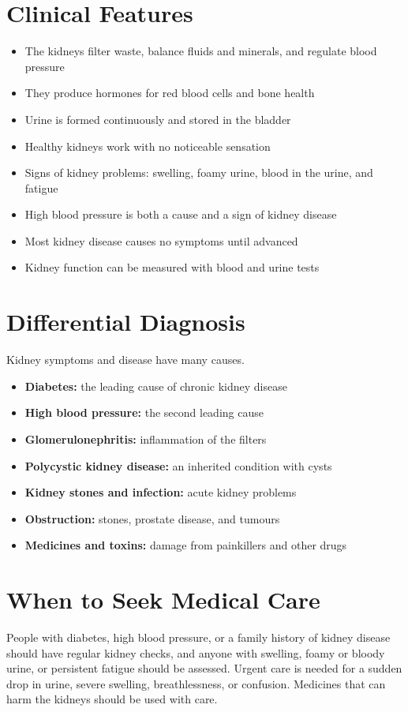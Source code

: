 \section*{Clinical Features}
\begin{itemize}
    \item The kidneys filter waste, balance fluids and minerals, and regulate blood pressure
    \item They produce hormones for red blood cells and bone health
    \item Urine is formed continuously and stored in the bladder
    \item Healthy kidneys work with no noticeable sensation
    \item Signs of kidney problems: swelling, foamy urine, blood in the urine, and fatigue
    \item High blood pressure is both a cause and a sign of kidney disease
    \item Most kidney disease causes no symptoms until advanced
    \item Kidney function can be measured with blood and urine tests
\end{itemize}

\section*{Differential Diagnosis}
Kidney symptoms and disease have many causes.
\begin{itemize}
    \item \textbf{Diabetes:} the leading cause of chronic kidney disease
    \item \textbf{High blood pressure:} the second leading cause
    \item \textbf{Glomerulonephritis:} inflammation of the filters
    \item \textbf{Polycystic kidney disease:} an inherited condition with cysts
    \item \textbf{Kidney stones and infection:} acute kidney problems
    \item \textbf{Obstruction:} stones, prostate disease, and tumours
    \item \textbf{Medicines and toxins:} damage from painkillers and other drugs
\end{itemize}

\section*{When to Seek Medical Care}
People with diabetes, high blood pressure, or a family history of kidney disease should have regular kidney checks, and anyone with swelling, foamy or bloody urine, or persistent fatigue should be assessed. Urgent care is needed for a sudden drop in urine, severe swelling, breathlessness, or confusion. Medicines that can harm the kidneys should be used with care.

